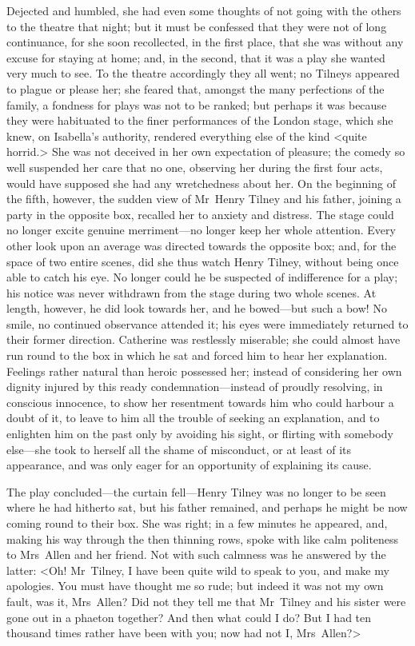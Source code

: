  Dejected and humbled, she had even some thoughts of not going with the others to the theatre that night; but it must be confessed that they were not of long continuance, for she soon recollected, in the first place, that she was without any excuse for staying at home; and, in the second, that it was a play she wanted very much to see. To the theatre accordingly they all went; no Tilneys appeared to plague or please her; she feared that, amongst the many perfections of the family, a fondness for plays was not to be ranked; but perhaps it was because they were habituated to the finer performances of the London stage, which she knew, on Isabella's authority, rendered everything else of the kind <quite horrid.> She was not deceived in her own expectation of pleasure; the comedy so well suspended her care that no one, observing her during the first four acts, would have supposed she had any wretchedness about her. On the beginning of the fifth, however, the sudden view of Mr~Henry Tilney and his father, joining a party in the opposite box, recalled her to anxiety and distress. The stage could no longer excite genuine merriment—no longer keep her whole attention. Every other look upon an average was directed towards the opposite box; and, for the space of two entire scenes, did she thus watch Henry Tilney, without being once able to catch his eye. No longer could he be suspected of indifference for a play; his notice was never withdrawn from the stage during two whole scenes. At length, however, he did look towards her, and he bowed—but such a bow! No smile, no continued observance attended it; his eyes were immediately returned to their former direction. Catherine was restlessly miserable; she could almost have run round to the box in which he sat and forced him to hear her explanation. Feelings rather natural than heroic possessed her; instead of considering her own dignity injured by this ready condemnation—instead of proudly resolving, in conscious innocence, to show her resentment towards him who could harbour a doubt of it, to leave to him all the trouble of seeking an explanation, and to enlighten him on the past only by avoiding his sight, or flirting with somebody else—she took to herself all the shame of misconduct, or at least of its appearance, and was only eager for an opportunity of explaining its cause. 

 The play concluded—the curtain fell—Henry Tilney was no longer to be seen where he had hitherto sat, but his father remained, and perhaps he might be now coming round to their box. She was right; in a few minutes he appeared, and, making his way through the then thinning rows, spoke with like calm politeness to Mrs~Allen and her friend. Not with such calmness was he answered by the latter: <Oh! Mr~Tilney, I have been quite wild to speak to you, and make my apologies. You must have thought me so rude; but indeed it was not my own fault, was it, Mrs~Allen? Did not they tell me that Mr~Tilney and his sister were gone out in a phaeton together? And then what could I do? But I had ten thousand times rather have been with you; now had not I, Mrs~Allen?> 


